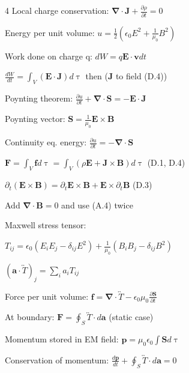 \documentclass[a4paper,twoside]{article}
\begin{document}
\begin{multicols*}{4}
Local charge conservation:
\(\bm \nabla \cdot \bm J + \frac{\partial \rho}{\partial t} = 0\)


Energy per unit volume:
\(u = \frac{1}{2} (\epsilon_0 E^2 + \frac{1}{\mu_0} B^2)\)

Work done on charge q:
\(dW = q \bm E \cdot \bm v dt\) 

\(\frac{dW}{dt} = \int_{V} (\bm E \cdot \bm J) d\uptau\) then (\(\bm J \) to field (D.4))

Poynting theorem:
\(\frac{\partial u}{\partial t} + \bm \nabla \cdot \bm S = -\bm E \cdot \bm J\)

Poynting vector:
\(\bm S = \frac{1}{\mu_0} \bm E \times \bm B\)

Continuity eq. energy:
\(\frac{\partial u}{\partial t} = -\bm \nabla \cdot \bm S \)


\(\bm F = \int_V \bm f d\uptau = \int_V (\rho \bm E + \bm J \times \bm B) d\uptau \) (D.1, D.4)   

\(
\partial_t (\bm E \times \bm B) = \partial_t\bm E \times \bm B + \bm E \times \partial_t \bm B
\) (D.3)

Add \(\bm \nabla \cdot \bm B=0\) and use (A.4) twice


Maxwell stress tensor:

\(T_{ij} = \epsilon_0 (E_iE_j-\delta_{ij}E^2) +\frac{1}{\mu_0} (B_iB_j-\delta_{ij}B^2)\)

\((\bm a \cdot \overleftrightarrow{T})_j = \sum_i a_i T_{ij}\)

Force per unit volume:
\(\bm f = \bm\nabla \cdot \overleftrightarrow{T} - \epsilon_0 \mu_0 \frac{\partial \bm S}{\partial t}\)



At boundary:
\(\bm F = \oint _S \overleftrightarrow{T} \cdot d\bm a\) (static case)


Momentum stored in EM field:
\(\bm p = \mu_0 \epsilon_0 \int \bm S d\uptau  \)

Conservation of momentum:
\(\frac{d\bm p}{dt} + \oint_S \overleftrightarrow{T} \cdot d\bm a = 0\)


\end{multicols*}
\end{document}
